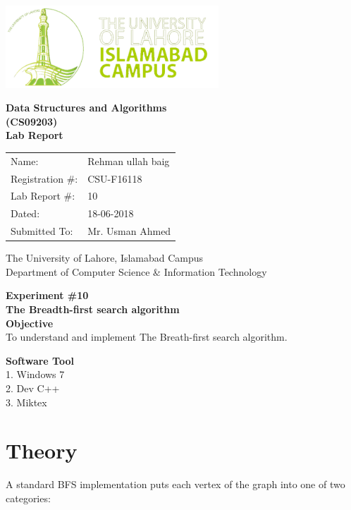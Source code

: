 \documentclass[12pt]{article}            %
\begin{document}
\begin{titlepage}
    \centering
  \vfill
    \includegraphics[width=8cm]{uni_logo.png} \\ 
	\vskip2cm
    {\bfseries\Large
	Data Structures and Algorithms \\ (CS09203)\\
	
	\vskip2cm
	Lab Report 
	 
	\vskip2cm
	}    

\begin{center}
\begin{tabular}{ l l  } 

Name: & Rehman ullah baig \\ 
Registration \#: &CSU-F16118 \\ 
Lab Report \#: & 10 \\ 
 Dated:& 18-06-2018\\ 
Submitted To:& Mr. Usman Ahmed\\ 

\end{tabular}
\end{center}
    \vfill
    The University of Lahore, Islamabad Campus\\
Department of Computer Science \& Information Technology
\end{titlepage}


    
    {\bfseries\Large
\centering
	Experiment \#10 \\

The Breadth-first search algorithm\\
	
	}    
 \vskip1cm
 \textbf {Objective}\\  To understand and implement The Breath-first search algorithm.
 
 \textbf {Software Tool} \\
1. Windows 7  \\
2. Dev C++\\
3. Miktex   \\

\section{Theory }              
A standard BFS implementation puts each vertex of the graph into one of two categories:
\end{document}
